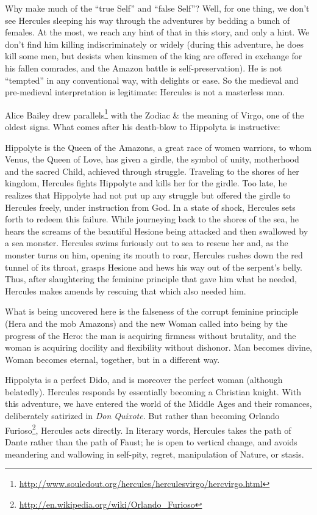 Why make much of the ``true Self'' and ``false Self''? Well, for one thing, we don't see Hercules sleeping his way through the adventures by bedding a bunch of females. At the most, we reach any hint of that in this story, and only a hint. We don't find him killing indiscriminately or widely (during this adventure, he does kill some men, but desists when kinsmen of the king are offered in exchange for his fallen comrades, and the Amazon battle is self-preservation). He is not ``tempted'' in any conventional way, with delights or ease. So the medieval and pre-medieval interpretation is legitimate: Hercules is not a masterless man.

Alice Bailey drew parallels\footnote{\url{http://www.souledout.org/hercules/herculesvirgo/hercvirgo.html}} with the Zodiac \& the meaning of Virgo, one of the oldest signs. What comes after his death-blow to Hippolyta is instructive:

\begin{quotex}
Hippolyte is the Queen of the Amazons, a great race of women warriors, to whom Venus, the Queen of Love, has given a girdle, the symbol of unity, motherhood and the sacred Child, achieved through struggle. Traveling to the shores of her kingdom, Hercules fights Hippolyte and kills her for the girdle. Too late, he realizes that Hippolyte had not put up any struggle but offered the girdle to Hercules freely, under instruction from God. In a state of shock, Hercules sets forth to redeem this failure. While journeying back to the shores of the sea, he hears the screams of the beautiful Hesione being attacked and then swallowed by a sea monster. Hercules swims furiously out to sea to rescue her and, as the monster turns on him, opening its mouth to roar, Hercules rushes down the red tunnel of its throat, grasps Hesione and hews his way out of the serpent's belly. Thus, after slaughtering the feminine principle that gave him what he needed, Hercules makes amends by rescuing that which also needed him.
\end{quotex}


What is being uncovered here is the falseness of the corrupt feminine principle (Hera and the mob Amazons) and the new Woman called into being by the progress of the Hero: the man is acquiring firmness without brutality, and the woman is acquiring docility and flexibility without dishonor. Man becomes divine, Woman becomes eternal, together, but in a different way.

Hippolyta is a perfect Dido, and is moreover the perfect woman (although belatedly). Hercules responds by essentially becoming a Christian knight. With this adventure, we have entered the world of the Middle Ages and their romances, deliberately satirized in \emph{Don Quixote}. But rather than becoming Orlando Furioso\footnote{\url{http://en.wikipedia.org/wiki/Orlando\_Furioso}}, Hercules acts directly. In literary words, Hercules takes the path of Dante rather than the path of Faust; he is open to vertical change, and avoids meandering and wallowing in self-pity, regret, manipulation of Nature, or stasis.

